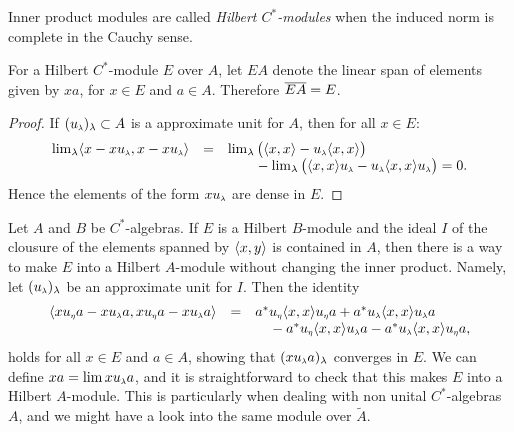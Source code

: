 \begin{definicao}
Inner product modules are called \textit{Hilbert \ensuremath{C^*}-modules} when the induced norm is complete in the Cauchy sense.
\end{definicao}

\begin{proposicao}\label{prop: EA = E}
For a Hilbert $C^*$-module $E$ over $A$, let $EA$ denote the linear span of elements given by $xa$, for $x\in E$ and $a\in A$. Therefore $\overline{EA} = E$.
\begin{proof}
If $(\sub u\lambda)_\lambda \subset A$ is a approximate unit for $A$, then for all $x\in E$:
\begin{equation*}
    \begin{array}{rcl}
        \lim_\lambda \inner{x-x\sub u\lambda}{x-x\sub u\lambda} &=& \lim_\lambda\big(\inner xx - \sub u\lambda \inner xx\big)  \\
        & & \hphantom{\lim_\lambda}- \lim_{\lambda} \big(\inner xx\sub u\lambda - \sub u\lambda \inner xx\sub u\lambda \big) = 0.
    \end{array}
\end{equation*}
Hence the elements of the form $x\sub u\lambda$ are dense in $E$. 
\end{proof}
\end{proposicao}

\begin{observacao}\label{obs: tornar um R-modulo em um K-modulo}
Let $A$ and $B$ be $C^*$-algebras. If $E$ is a Hilbert $B$-module and the ideal $I$ of the clousure of the elements spanned by $\langle {x},{y}\rangle$ is contained in $A$, then there is a way to make $E$ into a Hilbert $A$-module without changing the inner product. Namely, let $(\sub u\lambda)_\lambda$ be an approximate unit for $I$. Then the identity
\begin{equation*}
\begin{array}{rcl}
    \inner{x \sub u\eta a-x \sub u\lambda a}{x \sub u\eta a-x \sub u\lambda a} &=& 
a^* \sub u\eta \inner xx \sub u\eta a+a^* \sub u\lambda \inner xx \sub u\lambda a \\ & & \hphantom{a^*}-a^* \sub u\eta \inner xx \sub u\lambda a-a^* \sub u\lambda \inner xx \sub u\eta a,
\end{array}
\end{equation*}
holds for all $x\in E$ and $a\in A$, showing that $(x\sub u\lambda a)_\lambda$ converges in $E$. We can define $x a=\lim x \sub u{\lambda} a$, and it is straightforward to check that this makes $E$ into a Hilbert $A$-module. This is particularly when dealing with non unital $C^*$-algebras $A$, and we might have a look into the same module over $\widetilde A$.
\end{observacao}


